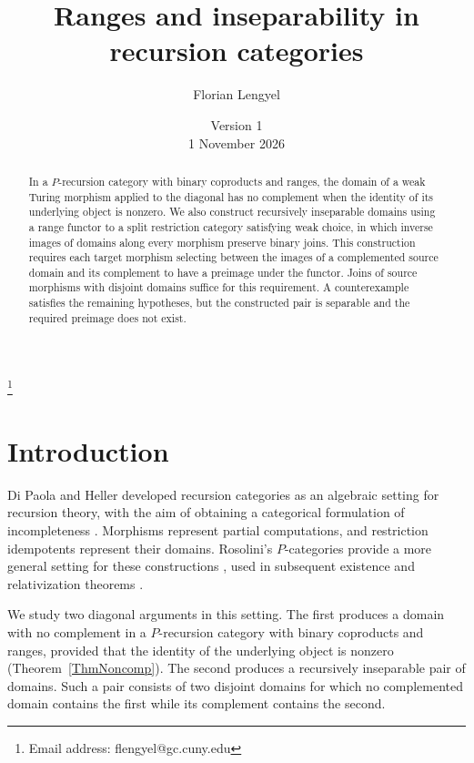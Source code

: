 \documentclass[letterpaper,10pt]{amsart}
\theoremstyle{plain}
\theoremstyle{definition}
\begin{document}
\title{Ranges and inseparability in recursion categories}
\author{Florian Lengyel}
\date{Version 1\\1 November 2026}
\thanks{Email address: flengyel@gc.cuny.edu}
\address{The Graduate School and University Center, %
Ph.D Program in Computer Science, %
The City University of New York, 365 Fifth Avenue, New York, NY %
10016}


\begin{abstract}
In a $P$-recursion category with binary coproducts and ranges, the
domain of a weak Turing morphism applied to the diagonal has no
complement when the identity of its underlying object is nonzero.
We also construct recursively inseparable domains using a range functor
to a split restriction category satisfying weak choice, in which inverse
images of domains along every morphism preserve binary joins.
This construction requires each target morphism selecting between the
images of a complemented source domain and its complement to have a preimage under
the functor. Joins of source morphisms with disjoint domains suffice
for this requirement. A counterexample satisfies the remaining
hypotheses, but the constructed pair is separable and the required
preimage does not exist.

\end{abstract}

\maketitle

\section{Introduction}
Di Paola and Heller developed recursion categories as an algebraic
setting for recursion theory, with the aim of obtaining a categorical
formulation of incompleteness \cite{MR88i:03078}. Morphisms represent
partial computations, and restriction idempotents represent their
domains. Rosolini's $P$-categories provide a more general setting for
these constructions \cite{coneit,MR90e:18001}, used in subsequent
existence and relativization theorems
\cite{MR92e:03067,MR95c:03110,leng}.

We study two diagonal arguments in this setting. The first produces a
domain with no complement in a $P$-recursion category with binary
coproducts and ranges, provided that the identity of the underlying
object is nonzero (Theorem~\ref{ThmNoncomp}). The second produces a
recursively inseparable pair of domains. Such a pair consists of two
disjoint domains for which no complemented domain contains the first
while its complement contains the second.
\end{document}
